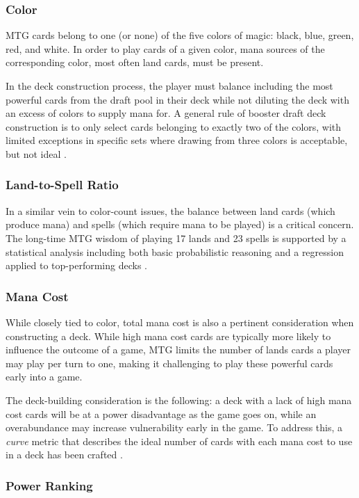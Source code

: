 \documentclass[letterpaper]{article} %
\begin{document}
\subsubsection{Color}

MTG cards belong to one (or none) of the five colors of magic: black, blue, green, red, and white. In order to play cards of a given color, mana sources of the corresponding color, most often land cards, must be present. 

In the deck construction process, the player must balance including the most powerful cards from the draft pool in their deck while not diluting the deck with an excess of colors to supply mana for. A general rule of booster draft deck construction is to only select cards belonging to exactly two of the colors, with limited exceptions in specific sets where drawing from three colors is acceptable, but not ideal \cite{karsten18}. 

\subsubsection{Land-to-Spell Ratio} In a similar vein to color-count issues, the balance between land cards (which produce mana) and spells (which require mana to be played) is a critical concern. The long-time MTG wisdom of playing 17 lands and 23 spells is supported by a statistical analysis including both basic probabilistic reasoning and a regression applied to top-performing decks \cite{karsten17a}.

\subsubsection{Mana Cost}

While closely tied to color, total mana cost is also a pertinent consideration when constructing a deck. While high mana cost cards are typically more likely to influence the outcome of a game, MTG limits the number of lands cards a player may play per turn to one, making it challenging to play these powerful cards early into a game.

The deck-building consideration is the following: a deck with a lack of high mana cost cards will be at a power disadvantage as the game goes on, while an overabundance may increase vulnerability early in the game. To address this, a \textit{curve} metric that describes the ideal number of cards with each mana cost to use in a deck has been crafted \cite{karsten14}.

\subsubsection{Power Ranking}
\end{document}
